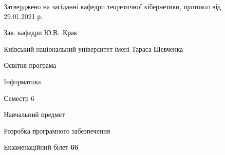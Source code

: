 \documentclass[10pt, ukrainian]{article}
\begin{document}
{\vspace{5mm}\smallskip \begin {small} Затверджено на засіданні кафедри теоретичної кібернетики, протокол  від   29.01.2021 р.\par\smallskip\smallskip
{\parbox {6.5 cm}{Зав. кафедри \dotfill Ю.В.~Крак}} \end{small}}
\newpage

{{\begin {small}\par
{ \center  Київський національний університет імені Тараса Шевченка \par}
{\parbox {5 cm}{Освітня програма \hfill}{\parbox {7 cm}{Інформатика \hfill}}\parbox {6 cm}{\hfill Семестр 6}}\par
{\parbox {5 cm} {Навчальний предмет \hfill}\parbox {7 cm}{Розробка програмного забезпечення \hfill}\parbox {6cm}{\hfill}\par}\vspace{-7pt} \end{small}}{\center Екзаменаційний білет \No \textbf
{ 66 }\par}}
\end{document}
